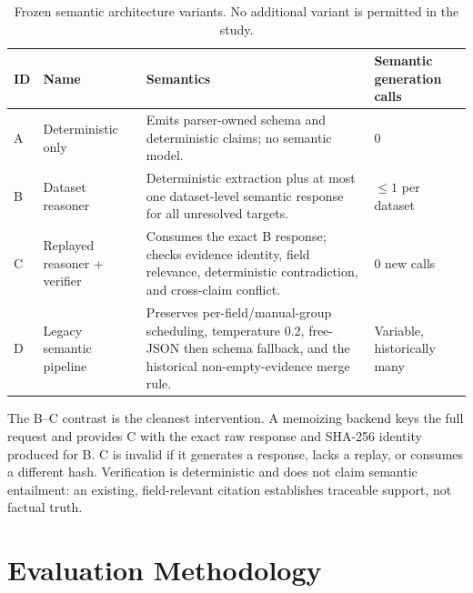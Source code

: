 \documentclass[11pt]{article}
\begin{document}
\begin{table}[H]
\centering
\caption{Frozen semantic architecture variants. No additional variant is permitted in the study.}
\label{tab:variants}
\begin{tabularx}{\textwidth}{@{}p{0.8cm}p{3.0cm}Yp{2.3cm}@{}}
\toprule
ID & Name & Semantics & Semantic generation calls \\
\midrule
A & Deterministic only & Emits parser-owned schema and deterministic claims; no semantic model. & 0 \\
B & Dataset reasoner & Deterministic extraction plus at most one dataset-level semantic response for all unresolved targets. & $\leq 1$ per dataset \\
C & Replayed reasoner + verifier & Consumes the exact B response; checks evidence identity, field relevance, deterministic contradiction, and cross-claim conflict. & 0 new calls \\
D & Legacy semantic pipeline & Preserves per-field/manual-group scheduling, temperature 0.2, free-JSON then schema fallback, and the historical non-empty-evidence merge rule. & Variable, historically many \\
\bottomrule
\end{tabularx}
\end{table}

The B--C contrast is the cleanest intervention. A memoizing backend keys the full
request and provides C with the exact raw response and SHA-256 identity produced for
B. C is invalid if it generates a response, lacks a replay, or consumes a different
hash. Verification is deterministic and does not claim semantic entailment: an
existing, field-relevant citation establishes traceable support, not factual truth.

\section{Evaluation Methodology}
\end{document}
